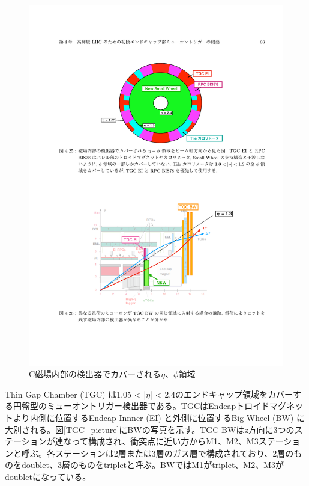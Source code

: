 \begin{figure} 
\centering
\includegraphics[width=16cm]{fig/Intro/SL_InnerCoin_covarage.pdf}
\caption[磁場内部の検出器でカバーされる$\eta$、$\phi$領域]{C磁場内部の検出器でカバーされる$\eta$、$\phi$領域\cite{mt_mino}}
\label{SL_InnerCoin_covarage}
\end{figure}


Thin Gap Chamber  (TGC) は1.05 < |$\eta$| < 2.4のエンドキャップ領域をカバーする円盤型のミューオントリガー検出器である。TGCはEndcapトロイドマグネットより内側に位置するEndcap Innner  (EI) と外側に位置するBig Wheel  (BW) に大別される。図\ref{TGC_picture}にBWの写真を示す。TGC BWはz方向に3つのステーションが連なって構成され、衝突点に近い方からM1、M2、M3ステーションと呼ぶ。各ステーションは2層または3層のガス層で構成されており、2層のものをdoublet、3層のものをtripletと呼ぶ。BWではM1がtriplet、M2、M3がdoubletになっている。

